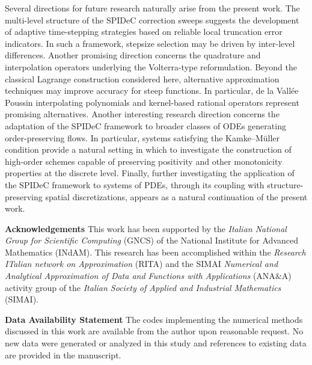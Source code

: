 \documentclass[a4paper,num-refs]{oup-contemporary-spidec}
\newenvironment{acknowledgement}{\par\addvspace{17pt}\small\rmfamily\noindent}{\par\addvspace{6pt}}
\begin{document}
Several directions for future research naturally arise from the present work. The multi-level structure of the SPIDeC correction sweeps suggests the development of adaptive time-stepping strategies based on reliable local truncation error indicators. In such a framework, stepsize selection may be driven by inter-level differences. Another promising direction concerns the quadrature and interpolation operators underlying the Volterra-type reformulation. Beyond the classical Lagrange construction considered here, alternative approximation techniques may improve accuracy for steep functions. In particular, de la Vallée Poussin interpolating polynomials \cite{Woula} and kernel-based rational operators \cite{Woula_Mark} represent promising alternatives. Another interesting research direction concerns the adaptation of the SPIDeC framework to broader classes of ODEs generating order-preserving flows. In particular, systems satisfying the Kamke–M{\"u}ller condition provide a natural setting in which to investigate the construction of high-order schemes capable of preserving positivity and other monotonicity properties at the discrete level. Finally, further investigating the application of the SPIDeC framework to systems of PDEs, through its coupling with structure-preserving spatial discretizations, appears as a natural continuation of the present work.

\begin{acknowledgement}
    {\color{jcolour}\textbf{Acknowledgements}} This work has been supported by the \emph{Italian National Group for Scientific Computing} (GNCS) of the National Institute for Advanced Mathematics (INdAM). This research has been accomplished within the \emph{Research ITalian network on Approximation} (RITA) and the SIMAI   \emph{Numerical and Analytical Approximation of Data and Functions with Applications} (ANA$\&$A) activity group of the \emph{Italian Society of Applied and Industrial Mathematics} (SIMAI). 
\end{acknowledgement}
\begin{acknowledgement}
    {\color{jcolour}\textbf{Data Availability Statement}} The codes implementing the numerical methods discussed in this work are available from the author upon reasonable request. No new data were generated or analyzed in this study and references to existing data are provided in the manuscript.
\end{acknowledgement}


\printbibliography
\end{document}
